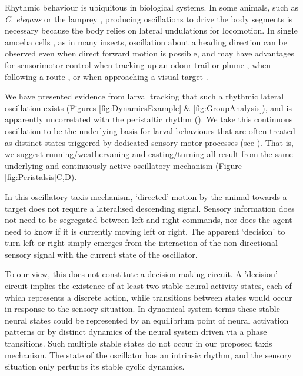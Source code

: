 \documentclass[11pt,a4paper]{article}
\begin{document}
 Rhythmic behaviour is ubiquitous in biological systems. In some animals, such as {\it C. elegans} \citep{iino2009parallel,izquierdo2010evolution,lockery2011computational}  or the lamprey  \citep{lansner1997realistic,wilson1999spikes}, producing oscillations to drive the body segments is necessary because the body relies on lateral undulations for locomotion.
 In single amoeba cells \citep{yangzigzag2011}, as in many insects, oscillation about a heading direction can be observed even when direct forward motion is possible, and may have advantages for sensorimotor control when tracking up an odour trail  \citep{hangartner1969structure,farkas1972chemical} or plume \citep{budick2006free, belanger1996centrally, willis1997centrally, willis2008effects,carde2008navigational}, when following a route \citep{lent2010image,kodzhabashev2015route}, or when approaching a visual target \citep{wallace1962experiments,philippides2013bumblebee,voss1998active}.

 We have presented evidence from larval tracking that such a rhythmic lateral oscillation exists (Figures \ref{fig:DynamicsExample} \& \ref{fig:GroupAnalysis}), and is apparently uncorrelated with the peristaltic rhythm ().
We take this continuous oscillation to be the underlying basis for larval behaviours that are often treated as distinct states triggered by dedicated sensory motor processes (see \cite{green1983organization,sawin1994sensorimotor, cobbwhatandhow1999,vogelstein2014discovery, gomez2012active, gomez2014multilevel, hernandez2015reverse,gepner2015computations}).
 That is, we suggest running/weathervaning and casting/turning all result from the same underlying and continuously active oscillatory mechanism (Figure \ref{fig:Peristalsis}C,D).
 
 In this oscillatory taxis mechanism, ‘directed’ motion by the animal towards a target does not require a lateralised descending signal. Sensory information does not need to be segregated between left and right commands, nor does the agent need to know if it is currently moving left or right. The apparent ‘decision’ to turn left or right simply emerges from the interaction of the non-directional sensory signal with the current state of the oscillator.
 
 To our view, this does not constitute a decision making circuit.
  A 'decision' circuit implies the existence of at least two stable neural activity states, each of which  represents a discrete action, while transitions between states would occur in response to the sensory situation.
  In dynamical system terms these stable neural states could be represented by an equilibrium point of neural activation patterns or by distinct dynamics of the neural system driven via a phase transitions.
   Such multiple stable states do not occur in our proposed taxis mechanism. The state of the oscillator has an intrinsic rhythm, and the sensory situation only perturbs its stable cyclic dynamics. 
\end{document}
